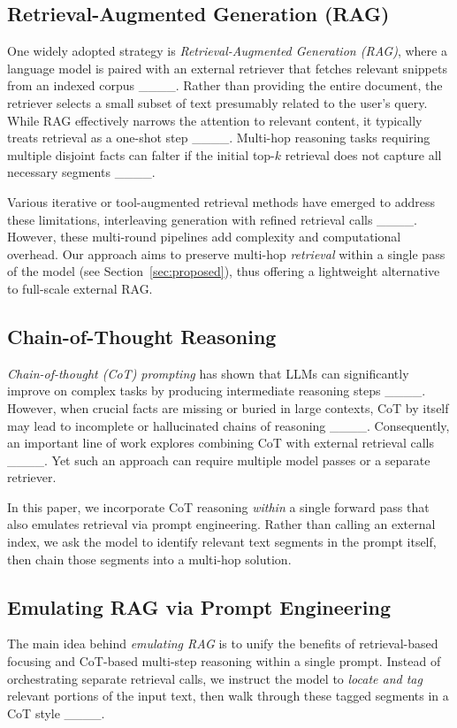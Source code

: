 \subsection{Retrieval-Augmented Generation (RAG)}
\label{subsec:rag}
One widely adopted strategy is \emph{Retrieval-Augmented Generation (RAG)}, where a language model is paired with an external retriever that fetches relevant snippets from an indexed corpus ____. Rather than providing the entire document, the retriever selects a small subset of text presumably related to the user's query. While RAG effectively narrows the attention to relevant content, it typically treats retrieval as a one-shot step ____. Multi-hop reasoning tasks requiring multiple disjoint facts can falter if the initial top-$k$ retrieval does not capture all necessary segments ____.

Various iterative or tool-augmented retrieval methods have emerged to address these limitations, interleaving generation with refined retrieval calls ____. However, these multi-round pipelines add complexity and computational overhead. Our approach aims to preserve multi-hop \emph{retrieval} within a single pass of the model (see Section~\ref{sec:proposed}), thus offering a lightweight alternative to full-scale external RAG.

\subsection{Chain-of-Thought Reasoning}
\label{subsec:cot}
\emph{Chain-of-thought (CoT) prompting} has shown that LLMs can significantly improve on complex tasks by producing intermediate reasoning steps ____. However, when crucial facts are missing or buried in large contexts, CoT by itself may lead to incomplete or hallucinated chains of reasoning ____. Consequently, an important line of work explores combining CoT with external retrieval calls ____. Yet such an approach can require multiple model passes or a separate retriever.

In this paper, we incorporate CoT reasoning \emph{within} a single forward pass that also emulates retrieval via prompt engineering. Rather than calling an external index, we ask the model to identify relevant text segments in the prompt itself, then chain those segments into a multi-hop solution.

\subsection{Emulating RAG via Prompt Engineering}
\label{subsec:emulating_rag}
The main idea behind \emph{emulating RAG} is to unify the benefits of retrieval-based focusing and CoT-based multi-step reasoning within a single prompt. Instead of orchestrating separate retrieval calls, we instruct the model to \emph{locate and tag} relevant portions of the input text, then walk through these tagged segments in a CoT style ____.

